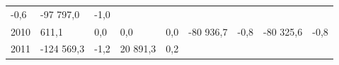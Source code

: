 \begin{longtable}[]{@{}lllllllll@{}}
\begin{minipage}[t]{0.06\columnwidth}
-0,6\strut
\end{minipage} & \begin{minipage}[t]{0.09\columnwidth}\raggedright
-97 797,0\strut
\end{minipage} & \begin{minipage}[t]{0.06\columnwidth}\raggedright
-1,0\strut
\end{minipage}\tabularnewline
\begin{minipage}[t]{0.05\columnwidth}\raggedright
2010\strut
\end{minipage} & \begin{minipage}[t]{0.10\columnwidth}\raggedright
611,1\strut
\end{minipage} & \begin{minipage}[t]{0.06\columnwidth}\raggedright
0,0\strut
\end{minipage} & \begin{minipage}[t]{0.16\columnwidth}\raggedright
0,0\strut
\end{minipage} & \begin{minipage}[t]{0.06\columnwidth}\raggedright
0,0\strut
\end{minipage} & \begin{minipage}[t]{0.12\columnwidth}\raggedright
-80 936,7\strut
\end{minipage} & \begin{minipage}[t]{0.06\columnwidth}\raggedright
-0,8\strut
\end{minipage} & \begin{minipage}[t]{0.09\columnwidth}\raggedright
-80 325,6\strut
\end{minipage} & \begin{minipage}[t]{0.06\columnwidth}\raggedright
-0,8\strut
\end{minipage}\tabularnewline
\begin{minipage}[t]{0.05\columnwidth}\raggedright
2011\strut
\end{minipage} & \begin{minipage}[t]{0.10\columnwidth}\raggedright
-124 569,3\strut
\end{minipage} & \begin{minipage}[t]{0.06\columnwidth}\raggedright
-1,2\strut
\end{minipage} & \begin{minipage}[t]{0.16\columnwidth}\raggedright
20 891,3\strut
\end{minipage} & \begin{minipage}[t]{0.06\columnwidth}\raggedright
0,2\strut
\end{minipage} & \begin{minipage}[t]{0.12\columnwidth}\raggedright

\end{minipage}
\end{longtable}

